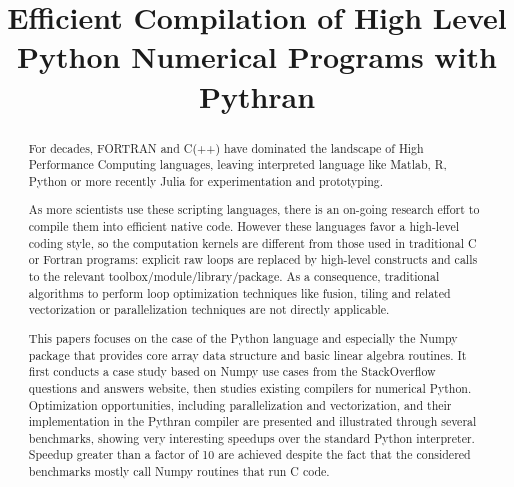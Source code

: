 \documentclass[10pt, preprint]{sigplanconf}
\begin{document}
\title{Efficient Compilation of High Level Python Numerical Programs with Pythran}

\authorinfo{\phantom{Serge Guelton}}
{}
{\phantom{serge.guelton@telecom-bretagne.eu}}
\authorinfo{\phantom{Pierrick Brunet}}
{\phantom{INRIA/MOAIS}}
{\phantom{pierrick.brunet@inria.fr}}
\authorinfo{\phantom{Mehdi Amini}}
{\phantom{SILKAN}}
{\phantom{mehdi.amini@silkan.com}}

\maketitle

\begin{abstract}

    For decades, FORTRAN and C(++) have dominated the landscape of High
    Performance Computing languages, leaving interpreted language like Matlab,
    R, Python or more recently Julia for experimentation and prototyping.

    As more scientists use these scripting languages, there is an on-going
    research effort to compile them into efficient native code. However these
    languages favor a high-level coding style, so the computation kernels are
    different from those used in traditional C or Fortran programs:
    explicit raw loops are replaced by high-level constructs and calls to the
    relevant toolbox/module/library/package. As a consequence, traditional
    algorithms to perform loop optimization techniques like fusion, tiling and
    related vectorization or parallelization techniques are not directly
    applicable.

    This papers focuses on the case of the Python language and especially the
    Numpy package that provides core array data structure and basic linear
    algebra routines. It first conducts a case study based on Numpy use
    cases from the StackOverflow questions and answers website, then studies
    existing compilers for numerical Python. Optimization opportunities,
    including parallelization and vectorization, and their implementation in
    the Pythran compiler are presented and illustrated through several
    benchmarks, showing very interesting speedups over the standard Python
    interpreter. Speedup greater than a factor of 10 are achieved despite the
    fact that the considered benchmarks mostly call Numpy routines that run C code.

\end{abstract}
\end{document}
